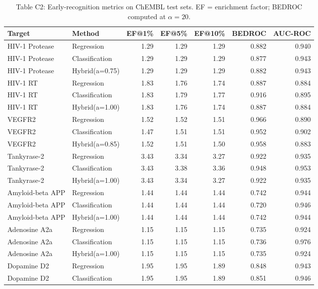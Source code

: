 \begin{table}[ht]
\caption{Table C2: Early-recognition metrics on ChEMBL test sets. EF = enrichment factor; BEDROC computed at $\alpha{=}20$.}
\label{tab:enrichment}
\centering\small
\begin{tabular}{llrrrrr}
\toprule
Target & Method & EF@1\% & EF@5\% & EF@10\% & BEDROC & AUC-ROC \\
\midrule
HIV-1 Protease & Regression & 1.29 & 1.29 & 1.29 & 0.882 & 0.940 \\
HIV-1 Protease & Classification & 1.29 & 1.29 & 1.29 & 0.877 & 0.943 \\
HIV-1 Protease & Hybrid(a=0.75) & 1.29 & 1.29 & 1.29 & 0.882 & 0.943 \\
\midrule
HIV-1 RT & Regression & 1.83 & 1.76 & 1.74 & 0.887 & 0.884 \\
HIV-1 RT & Classification & 1.83 & 1.79 & 1.77 & 0.916 & 0.895 \\
HIV-1 RT & Hybrid(a=1.00) & 1.83 & 1.76 & 1.74 & 0.887 & 0.884 \\
\midrule
VEGFR2 & Regression & 1.52 & 1.52 & 1.51 & 0.966 & 0.890 \\
VEGFR2 & Classification & 1.47 & 1.51 & 1.51 & 0.952 & 0.902 \\
VEGFR2 & Hybrid(a=0.85) & 1.52 & 1.51 & 1.50 & 0.958 & 0.883 \\
\midrule
Tankyrase-2 & Regression & 3.43 & 3.34 & 3.27 & 0.922 & 0.935 \\
Tankyrase-2 & Classification & 3.43 & 3.38 & 3.36 & 0.948 & 0.953 \\
Tankyrase-2 & Hybrid(a=1.00) & 3.43 & 3.34 & 3.27 & 0.922 & 0.935 \\
\midrule
Amyloid-beta APP & Regression & 1.44 & 1.44 & 1.44 & 0.742 & 0.944 \\
Amyloid-beta APP & Classification & 1.44 & 1.44 & 1.44 & 0.720 & 0.946 \\
Amyloid-beta APP & Hybrid(a=1.00) & 1.44 & 1.44 & 1.44 & 0.742 & 0.944 \\
\midrule
Adenosine A2a & Regression & 1.15 & 1.15 & 1.15 & 0.735 & 0.924 \\
Adenosine A2a & Classification & 1.15 & 1.15 & 1.15 & 0.736 & 0.976 \\
Adenosine A2a & Hybrid(a=1.00) & 1.15 & 1.15 & 1.15 & 0.735 & 0.924 \\
\midrule
Dopamine D2 & Regression & 1.95 & 1.95 & 1.89 & 0.848 & 0.943 \\
Dopamine D2 & Classification & 1.95 & 1.95 & 1.89 & 0.851 & 0.946 \\

\end{tabular}
\end{table}
